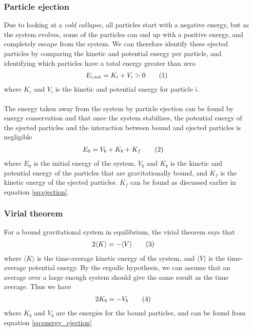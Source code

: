 \documentclass{article}
\newcommand\numberthis{\addtocounter{equation}{1}\tag{\theequation}}
\begin{document}
\subsubsection{Particle ejection}
Due to looking at a \textit{cold collapse}, all particles start with a negative energy, but as the system evolves, some of the particles can end up with a positive energy, and completely escape from the system. We can therefore identify these ejected particles by comparing the kinetic and potential energy per particle, and identifying which particles have a total energy greater than zero
\begin{align*}
  E_{i,\text{tot}} = K_i + V_i > 0 \numberthis\label{eq:ejection}
\end{align*}
where $K_i$ and $V_i$ is the kinetic and potential energy for particle $i$.\\\\
The energy taken away from the system by particle ejection can be found by energy conservation and that once the system stabilizes, the potential energy of the ejected particles and the interaction between bound and ejected particles is negligible
\begin{align*}
  E_0 &= V_b + K_b + K_f \numberthis\label{eq:energy_ejection}
\end{align*}
where $E_0$ is the initial energy of the system, $V_b$ and $K_b$ is the kinetic and potential energy of the particles that are gravitationally bound, and $K_f$ is the kinetic energy of the ejected particles.
$K_f$ can be found as discussed earlier in equation \eqref{eq:ejection}.

\subsubsection{Virial theorem}
For a bound gravitational system in equilibrium, the virial theorem says that
\begin{align*}
  2\langle K\rangle &= -\langle V\rangle \numberthis\label{eq:virial}
\end{align*}
where $\langle K\rangle$ is the time-average kinetic energy of the system, and $\langle V\rangle$ is the time-average potential energy. By the ergodic hypothesis, we can assume that an average over a large enough system should give the same result as the time average. Thus we have
\begin{align*}
  2K_b &= -V_b \numberthis\label{eq:virial2}
\end{align*}
where $K_b$ and $V_b$ are the energies for the bound particles, and can be found from equation \eqref{eq:energy_ejection}
\end{document}

